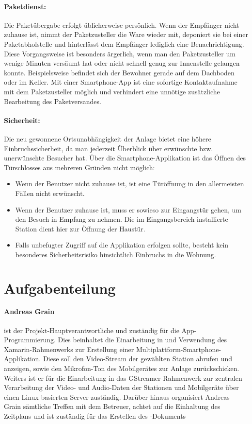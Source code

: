 \paragraph{Paketdienst:}
Die Paketübergabe erfolgt üblicherweise persönlich.
Wenn der Empfänger nicht zuhause ist, nimmt der Paketzusteller die Ware wieder mit, deponiert sie bei einer Paketabholstelle und hinterlässt dem Empfänger lediglich eine Benachrichtigung.
Diese Vorgangsweise ist besonders ärgerlich, wenn man den Paketzusteller um wenige Minuten versäumt hat oder nicht schnell genug zur Innenstelle gelangen konnte.
Beispielsweise befindet sich der Bewohner gerade auf dem Dachboden oder im Keller.
Mit einer Smartphone-App ist eine sofortige Kontaktaufnahme mit dem Paketzusteller möglich und verhindert eine unnötige zusätzliche Bearbeitung des Paketversandes.

\paragraph{Sicherheit:}
Die neu gewonnene Ortsunabhängigkeit der Anlage bietet eine höhere Einbruchssicherheit, da man jederzeit Überblick über erwünschte bzw. unerwünschte Besucher hat.
Über die Smartphone-Applikation ist das Öffnen des Türschlosses aus mehreren Gründen nicht möglich:
\begin{itemize}
    \item Wenn der Benutzer nicht zuhause ist, ist eine Türöffnung in den allermeisten Fällen nicht erwünscht.
    \item Wenn der Benutzer zuhause ist, muss er sowieso zur Eingangstür gehen, um den Besuch in Empfang zu nehmen. Die im Eingangsbereich installierte Station dient hier zur Öffnung der Haustür.
    \item Falls unbefugter Zugriff auf die Applikation erfolgen sollte, besteht kein besonderes Sicherheitsrisiko hinsichtlich Einbruchs in die Wohnung.
\end{itemize}

\section{Aufgabenteilung}
\paragraph{Andreas Grain} ist der Projekt-Hauptverantwortliche und zuständig für die App-Pro\-gram\-mierung.
Dies beinhaltet die Einarbeitung in und Verwendung des Xamarin-Rahmenwerks zur Erstellung einer Multiplattform-Smartphone-Applikation.
Diese soll den Video-Stream der gewählten Station abrufen und anzeigen, sowie den Mikrofon-Ton des Mobilgerätes zur Anlage zurückschicken.
Weiters ist er für die Einarbeitung in das GStreamer-Rahmenwerk zur zentralen Verarbeitung der Video- und Audio-Daten der Stationen und Mobilgeräte über einen Linux-basierten Server zuständig.
Darüber hinaus organisiert Andreas Grain sämtliche Treffen mit dem Betreuer, achtet auf die Einhaltung des Zeitplans und ist zuständig für das Erstellen des -Dokuments

